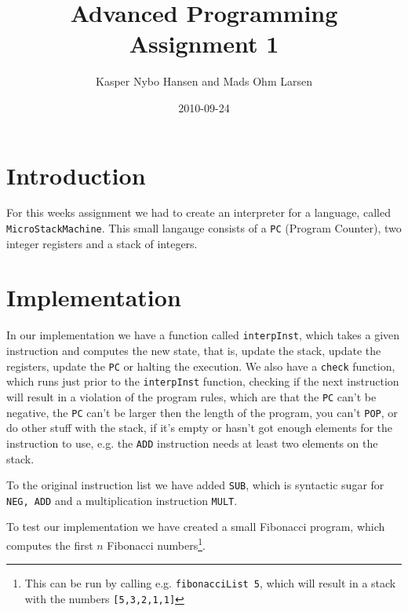\documentclass[10pt, a4paper]{article}
\title{Advanced Programming \\Assignment 1}
\author{Kasper Nybo Hansen and Mads Ohm Larsen}
\date{2010-09-24}
\begin{document}
	
\maketitle
\section{Introduction}
For this weeks assignment we had to create an interpreter for a language, called \texttt{MicroStackMachine}.
This small langauge consists of a \texttt{PC} (Program Counter), two integer registers and a stack of integers.

\section{Implementation}
In our implementation we have a function called \texttt{interpInst}, which takes a given instruction and computes the new state, that is, update the stack, update the registers, update the \texttt{PC} or halting the execution.
We also have a \texttt{check} function, which runs just prior to the \texttt{interpInst} function, checking if the next instruction will result in a violation of the program rules, which are that the \texttt{PC} can't be negative, the \texttt{PC} can't be larger then the length of the program, you can't \texttt{POP}, or do other stuff with the stack, if it's empty or hasn't got enough elements for the instruction to use, e.g. the \texttt{ADD} instruction needs at least two elements on the stack.

To the original instruction list we have added \texttt{SUB}, which is syntactic sugar for \texttt{NEG, ADD} and a multiplication instruction \texttt{MULT}.

To test our implementation we have created a small Fibonacci program, which computes the first $n$ Fibonacci numbers\footnote{This can be run by calling e.g. \texttt{fibonacciList 5}, which will result in a stack with the numbers \texttt{[5,3,2,1,1]}}.
\end{document}
